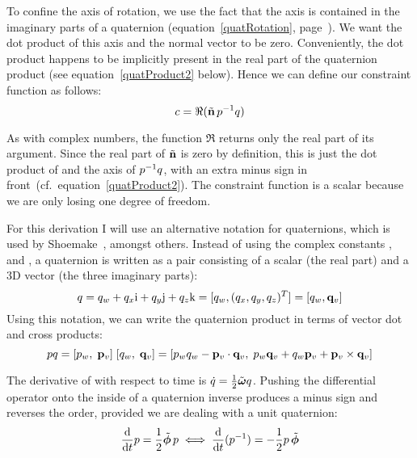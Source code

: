 To confine the axis of rotation, we use the fact that the axis is contained in the imaginary
parts of a quaternion (equation~\ref{quatRotation}, page~\pageref{quatRotation}). We want the dot
product of this axis and the normal vector  to be zero. Conveniently, the dot product
happens to be implicitly present in the real part of the quaternion product
(see equation~\ref{quatProduct2} below). Hence we can define our constraint
function as follows:
\begin{equation}\label{rotConstrEqn}
c = \Re(\tilde{\ve{n}}\, \q{p}^{-1}\q{q})
\end{equation}

As with complex numbers, the function $\Re$ returns only the real part of its argument.
Since the real part of $\tilde{\ve{n}}$ is zero by definition, this is just the dot product of
 and the axis of $p^{-1}q$, with an extra minus sign in
front~(cf.\ equation~\ref{quatProduct2}). The constraint function is a scalar because
we are only losing one degree of freedom.

For this derivation I will use an alternative notation for quaternions, which is used by
Shoemake~\cite{Shoemake:85}, amongst others. Instead of using the complex constants \qi{}, \qj{}
and \qk{}, a quaternion is written as a pair consisting of a scalar (the real part) and a 3D
vector (the three imaginary parts):
\begin{equation}
\q{q} = q_w + q_x\qi + q_y\qj + q_z\qk = [q_w, (q_x, q_y, q_z)^T] = [q_w, \ve{q}_v]
\end{equation}
Using this notation, we can write the quaternion product in terms of vector dot and cross products:
\begin{equation}\label{quatProduct2}
\q{p}\q{q} = [p_w,\; \ve{p}_v]\;[q_w,\; \ve{q}_v] =
    [p_w q_w - \ve{p}_v \cdot \ve{q}_v,\;
    p_w \ve{q}_v + q_w \ve{p}_v + \ve{p}_v \times \ve{q}_v]
\end{equation}

The derivative of  with respect to time is
$\dot{\q{q}} = \frac{1}{2}\tilde{\ve{\omega}}\q{q}$. Pushing the differential operator
onto the inside of a quaternion inverse produces a minus sign and reverses the order, provided
we are dealing with a unit quaternion:
\begin{equation}
\frac{\diff}{\diff t} \q{p} = \frac{1}{2}\tilde{\ve{\phi}}\,\q{p} \iff
    \frac{\diff}{\diff t} (\q{p}^{-1}) = -\frac{1}{2}\q{p}\,\tilde{\ve{\phi}}
\end{equation}

